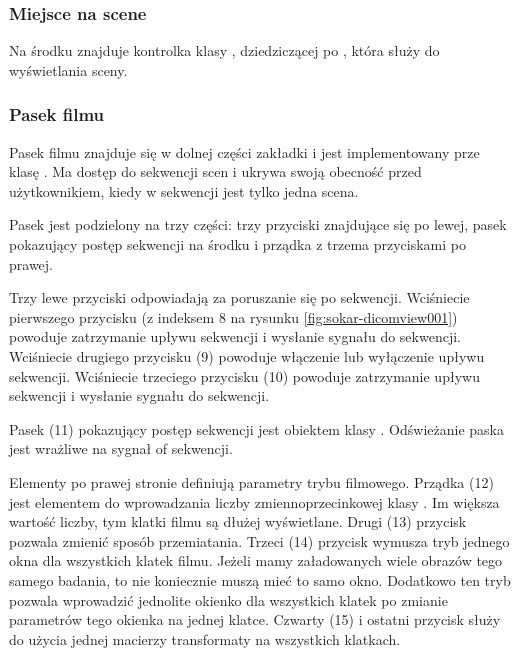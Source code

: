 \subsubsection{Miejsce na scene}
\label{sec:sokar-dicomgraphics}
\par
Na środku znajduje kontrolka klasy , dziedziczącej po , która służy do wyświetlania sceny.

\subsubsection{Pasek filmu}
\label{sec:sokar-moviebar}

\par
Pasek filmu znajduje się w dolnej części zakładki i jest implementowany prze klasę .
Ma dostęp do sekwencji scen i ukrywa swoją obecność przed użytkownikiem, kiedy w sekwencji jest tylko jedna scena.

\par
Pasek jest podzielony na trzy części: trzy przyciski znajdujące się po lewej, pasek pokazujący postęp sekwencji na środku i prządka z trzema przyciskami po prawej.

\par
Trzy lewe przyciski odpowiadają za poruszanie się po sekwencji.
Wciśniecie pierwszego przycisku (z indeksem 8 na rysunku \ref{fig:sokar-dicomview001}) powoduje zatrzymanie upływu sekwencji i wysłanie sygnału  do sekwencji.
Wciśniecie drugiego przycisku (9) powoduje włączenie lub wyłączenie upływu sekwencji.
Wciśniecie trzeciego przycisku (10) powoduje zatrzymanie upływu sekwencji i wysłanie sygnału  do sekwencji.
\par
Pasek (11) pokazujący postęp sekwencji jest obiektem klasy .
Odświeżanie paska jest wrażliwe na sygnał  of sekwencji.
\par
Elementy po prawej stronie definiują parametry trybu filmowego.
Prządka (12) jest elementem do wprowadzania liczby zmiennoprzecinkowej klasy .
Im większa wartość liczby, tym klatki filmu są dłużej wyświetlane.
Drugi (13) przycisk pozwala zmienić sposób przemiatania.
Trzeci (14) przycisk wymusza tryb jednego okna dla wszystkich klatek filmu.
Jeżeli mamy załadowanych wiele obrazów tego samego badania, to nie koniecznie muszą mieć to samo okno.
Dodatkowo ten tryb pozwala wprowadzić jednolite okienko dla wszystkich klatek po zmianie parametrów tego okienka na jednej klatce.
Czwarty (15) i ostatni przycisk służy do użycia jednej macierzy transformaty na wszystkich klatkach.

